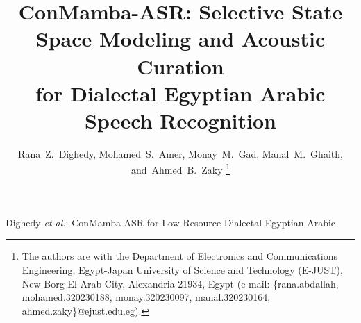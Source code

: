 \documentclass[journal]{IEEEtran}
\begin{document}
\title{\Large ConMamba-ASR: Selective State Space Modeling and Acoustic Curation\\for Dialectal Egyptian Arabic Speech Recognition}

\author{Rana~Z.~Dighedy,
        Mohamed~S.~Amer,
        Monay~M.~Gad,
        Manal~M.~Ghaith,
        and~Ahmed~B.~Zaky%
\thanks{The authors are with the Department of Electronics and Communications Engineering, Egypt-Japan University of Science and Technology (E-JUST), New Borg El-Arab City, Alexandria 21934, Egypt (e-mail: \{rana.abdallah, mohamed.320230188, monay.320230097, manal.320230164, ahmed.zaky\}@ejust.edu.eg).}}

%
{Dighedy \MakeLowercase{\textit{et al.}}: ConMamba-ASR for Low-Resource Dialectal Egyptian Arabic}

\maketitle
\end{document}
